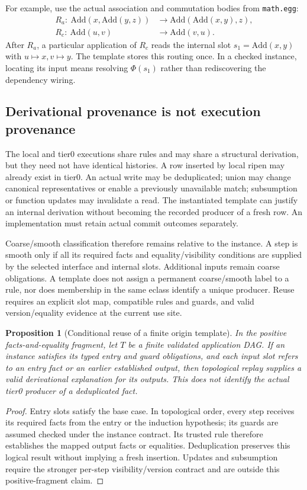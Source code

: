 \documentclass[11pt,a4paper]{article}
\newtheorem{proposition}{Proposition}
\begin{document}
For example, use the actual association and commutation bodies from
\texttt{math.egg}:
\begin{align}
 R_a:\ \mathrm{Add}(x,\mathrm{Add}(y,z))
   &\longrightarrow \mathrm{Add}(\mathrm{Add}(x,y),z),\\
 R_c:\ \mathrm{Add}(u,v)&\longrightarrow\mathrm{Add}(v,u).
\end{align}
After $R_a$, a particular application of $R_c$ reads the internal slot
$s_1=\mathrm{Add}(x,y)$ with $u\mapsto x,v\mapsto y$. The template stores this
routing once. In a checked instance, locating its input means resolving
$\Phi(s_1)$ rather than rediscovering the dependency wiring.
\OriginTemplateFigure

\subsection{Derivational provenance is not execution provenance}
The local and tier0 executions share rules and may share a structural derivation,
but they need not have identical histories. A row inserted by local ripen may
already exist in tier0. An actual write may be deduplicated; union may change
canonical representatives or enable a previously unavailable match; subsumption
or function updates may invalidate a read. The instantiated template can justify
an internal derivation without becoming the recorded producer of a fresh row.
An implementation must retain actual commit outcomes separately.

Coarse/smooth classification therefore remains relative to the instance. A step
is smooth only if all its required facts and equality/visibility conditions are
supplied by the selected interface and internal slots. Additional inputs remain
coarse obligations. A template does not assign a permanent coarse/smooth label
to a rule, nor does membership in the same eclass identify a unique producer.
Reuse requires an explicit slot map, compatible rules and guards, and valid
version/equality evidence at the current use site.

\begin{proposition}[Conditional reuse of a finite origin template]
In the positive facts-and-equality fragment, let $T$ be a finite validated
application DAG. If an instance satisfies its typed entry and guard obligations,
and each input slot refers to an entry fact or an earlier established output,
then topological replay supplies a valid derivational explanation for its outputs.
This does not identify the actual tier0 producer of a deduplicated fact.
\end{proposition}
\begin{proof}
Entry slots satisfy the base case. In topological order, every step receives its
required facts from the entry or the induction hypothesis; its guards are assumed
checked under the instance contract. Its trusted rule therefore establishes the
mapped output facts or equalities. Deduplication preserves this logical result
without implying a fresh insertion. Updates and subsumption require the stronger
per-step visibility/version contract and are outside this positive-fragment claim.
\end{proof}
\end{document}
